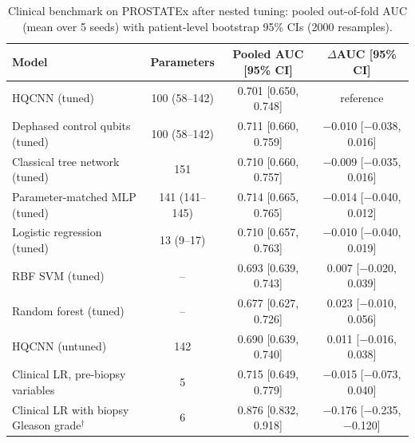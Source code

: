\begin{table}[tbp]
\centering
\caption{Clinical benchmark on PROSTATEx after nested tuning: pooled out-of-fold AUC (mean over 5 seeds) with patient-level bootstrap 95\% CIs (2000 resamples).}
\label{tab:main_results}
\small
\begin{tabular}{lccc}
\toprule
Model & Parameters & Pooled AUC [95\% CI] & $\Delta$AUC [95\% CI] \\
\midrule
HQCNN (tuned) & \num{100} (\num{58}--\num{142}) & \num{0.701} [\num{0.650}, \num{0.748}] & reference \\
Dephased control qubits (tuned) & \num{100} (\num{58}--\num{142}) & \num{0.711} [\num{0.660}, \num{0.759}] & \num{-0.010} [\num{-0.038}, \num{+0.016}] \\
Classical tree network (tuned) & \num{151} & \num{0.710} [\num{0.660}, \num{0.757}] & \num{-0.009} [\num{-0.035}, \num{+0.016}] \\
Parameter-matched MLP (tuned) & \num{141} (\num{141}--\num{145}) & \num{0.714} [\num{0.665}, \num{0.765}] & \num{-0.014} [\num{-0.040}, \num{+0.012}] \\
Logistic regression (tuned) & \num{13} (\num{9}--\num{17}) & \num{0.710} [\num{0.657}, \num{0.763}] & \num{-0.010} [\num{-0.040}, \num{+0.019}] \\
RBF SVM (tuned) & -- & \num{0.693} [\num{0.639}, \num{0.743}] & \num{+0.007} [\num{-0.020}, \num{+0.039}] \\
Random forest (tuned) & -- & \num{0.677} [\num{0.627}, \num{0.726}] & \num{+0.023} [\num{-0.010}, \num{+0.056}] \\
\midrule
HQCNN (untuned) & \num{142} & \num{0.690} [\num{0.639}, \num{0.740}] & \num{+0.011} [\num{-0.016}, \num{+0.038}] \\
Clinical LR, pre-biopsy variables & \num{5} & \num{0.715} [\num{0.649}, \num{0.779}] & \num{-0.015} [\num{-0.073}, \num{+0.040}] \\
Clinical LR with biopsy Gleason grade$^{\dagger}$ & \num{6} & \num{0.876} [\num{0.832}, \num{0.918}] & \num{-0.176} [\num{-0.235}, \num{-0.120}] \\
\bottomrule
\end{tabular}
\par{}
\end{table}
